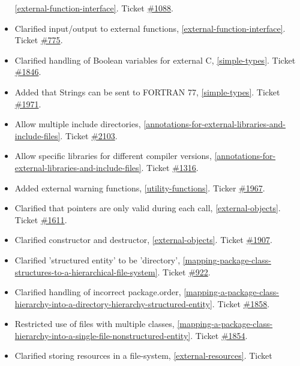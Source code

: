 \begin{itemize}
  \autoref{external-function-interface}. Ticket
  \href{https://trac.modelica.org/Modelica/ticket/1088}{\#1088}.
\item
  Clarified input/output to external functions, \autoref{external-function-interface}. Ticket
  \href{https://trac.modelica.org/Modelica/ticket/775}{\#775}.
\item
  Clarified handling of Boolean variables for external C, 
  \autoref{simple-types}. Ticket
  \href{https://trac.modelica.org/Modelica/ticket/1846}{\#1846}.
\item
  Added that Strings can be sent to FORTRAN 77, \autoref{simple-types}. Ticket
  \href{https://trac.modelica.org/Modelica/ticket/1971}{\#1971}.
\item
  Allow multiple include directories, \autoref{annotations-for-external-libraries-and-include-files}. Ticket
  \href{https://trac.modelica.org/Modelica/ticket/2103}{\#2103}.
\item
  Allow specific libraries for different compiler versions, 
  \autoref{annotations-for-external-libraries-and-include-files}. Ticket
  \href{https://trac.modelica.org/Modelica/ticket/1316}{\#1316}.
\item
  Added external warning functions, \autoref{utility-functions}. Ticker
  \href{https://trac.modelica.org/Modelica/ticket/1967}{\#1967}.
\item
  Clarified that pointers are only valid during each call, \autoref{external-objects}. Ticket
  \href{https://trac.modelica.org/Modelica/ticket/1611}{\#1611}.
\item
  Clarified constructor and destructor, \autoref{external-objects}. Ticket
  \href{https://trac.modelica.org/Modelica/ticket/1907}{\#1907}.
\item
  Clarified 'structured entity' to be 'directory', \autoref{mapping-package-class-structures-to-a-hierarchical-file-system}.
  Ticket \href{https://trac.modelica.org/Modelica/ticket/922}{\#922}.
\item
  Clarified handling of incorrect package.order, \autoref{mapping-a-package-class-hierarchy-into-a-directory-hierarchy-structured-entity}.
  Ticket \href{https://trac.modelica.org/Modelica/ticket/1858}{\#1858}.
\item
  Restricted use of files with multiple classes, \autoref{mapping-a-package-class-hierarchy-into-a-single-file-nonstructured-entity}.
  Ticket \href{https://trac.modelica.org/Modelica/ticket/1854}{\#1854}.
\item
  Clarified storing resources in a file-system, \autoref{external-resources}. Ticket

\end{itemize}
